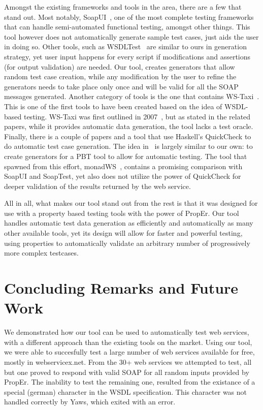 \documentclass[submission,copyright]{eptcs}
\begin{document}
Amongst the existing frameworks and tools in the area, there are a few that 
stand out. 
Most notably, SoapUI~\cite{soapUI}, one of the most complete testing frameworks
that can handle semi-automated functional testing, amongst other things. This 
tool however does not automatically generate sample test cases, just aids the
user in doing so.
Other tools, such as WSDLTest~\cite{wsdltest@IEEE06} are similar to ours in 
generation strategy, yet user input happens for every script if modifications 
and assertions (for output validation) are needed. Our tool, creates generators 
that allow random test case creation, while any modification by the user to
refine the generators needs to take place only once and will be valid for all
the SOAP messages generated.
Another category of tools is the one that contains WS-Taxi~\cite{taxi@IC-08}. 
This is one of the first tools to have been created based on the idea
of WSDL-based testing. WS-Taxi was first outlined in
2007~\cite{partition@AST-07}, but as stated in the related papers,
while it provides automatic data generation, the tool lacks a test oracle.
%
Finally, there is a couple of papers and a tool that use Haskell's
QuickCheck to do automatic test case generation. The idea
in~\cite{ws_quickcheck} is largely similar to our own: to create
generators for a PBT tool to allow for automatic testing. The tool
that spawned from this effort, monadWS~\cite{monadWS@AST-11}, contains
a promising comparison with SoapUI and SoapTest, yet also does not
utilize the power of QuickCheck for deeper validation of the results
returned by the web service.

All in all, what makes our tool stand out from the rest is that it 
was designed for use with a property based testing tools with the 
power of PropEr. Our tool handles automatic test data generation as
efficiently and automatically as many other available tools, yet its
design will allow for faster and powerful testing, using properties 
to automatically validate an arbitrary number of progressively more 
complex testcases.

\section{Concluding Remarks and Future Work}

We demonstrated how our tool can be used to automatically test web services, 
with a different approach than the existing tools on the market. Using our 
tool, we were able to succesfully test a large number of web services 
available for free, mostly in webservicex.net. From the 30+ web services we 
attempted to test, all but one proved to respond with valid SOAP for all random 
inputs provided by PropEr. The inability to test the remaining one, resulted 
from the existance of a special (german) character in the WSDL specification.
This character was not handled correctly by Yaws, which exited with an error. 
\end{document}
